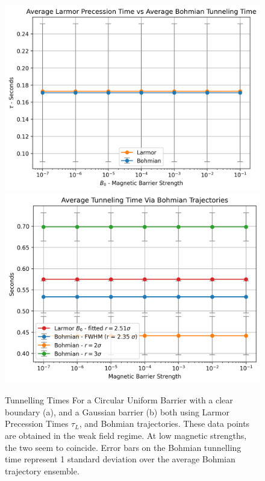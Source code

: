 \begin{figure}
    \centering
    \includegraphics[width=1\linewidth]{Figures//2dspin/353e2f92-95a8-4c1b-b7b5-79fe511d7af9.png}
    \includegraphics[width=1\linewidth]{Figures//2dspin/70557699-091f-4e39-a011-df61dbb7382d.png}
    
    \caption{Tunnelling Times For a Circular Uniform Barrier with a clear boundary (a), and a Gaussian barrier (b) both using Larmor Precession Times $\tau_L$, and Bohmian trajectories. These data points are obtained in the weak field regime. At low magnetic strengths, the two seem to coincide. Error bars on the Bohmian tunnelling time represent 1 standard deviation over the average Bohmian trajectory ensemble.}
    \label{fig:tunneling_times}
\end{figure}


